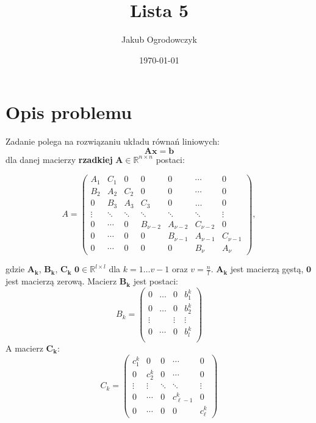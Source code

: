 \documentclass{article}
\begin{document}
\title{Lista 5}
\author{Jakub Ogrodowczyk}
\date{\today}

\maketitle

\section{Opis problemu}
Zadanie polega na rozwiązaniu układu równań liniowych:
\[
    \mathbf{Ax = b}    
\]
dla danej macierzy \textbf{rzadkiej} \( \mathbf{A} \in \mathbb{R}^{n \times n}\) postaci: 

\[
A = 
\begin{pmatrix}
A_1 & C_1 & 0 & 0 & 0 & \cdots & 0 \\
B_2 & A_2 & C_2 & 0 & 0 & \cdots & 0 \\
0 & B_3 & A_3 & C_3 & 0 & \hdots & 0  \\
\vdots & \ddots & \ddots & \ddots & \ddots & \ddots & \vdots \\
0 & \cdots & 0 & B_{\nu-2} & A_{\nu-2} & C_{\nu-2} & 0 \\
0 & \cdots & 0 & 0 & B_{\nu-1} & A_{\nu-1} & C_{\nu-1} \\
0 & \cdots & 0 & 0 & 0 & B_\nu & A_\nu
\end{pmatrix},
\]

gdzie $\mathbf{A_k}$, $\mathbf{B_k}$, $\mathbf{C_k}$ $\mathbf{0} \in \mathbb{R}^{l \times l}$ dla $k=1\hdots v-1$ oraz $v=\frac{n}{l}$.
$\mathbf{A_k}$ jest macierzą gęstą, $\mathbf{0}$ jest macierzą zerową.
Macierz $\mathbf{B_k}$ jest postaci:
\[
B_k = 
\begin{pmatrix}
0 & \hdots & 0  & b_1^k \\
0 & \hdots & 0  & b_2^k \\
\vdots &  & \vdots  & \vdots \\
0 & \cdots & 0  & b_l^k \\
\end{pmatrix}
\]
A macierz $\mathbf{C_k}$:
\[
C_k = 
\begin{pmatrix}
c_1^k & 0 & 0 & \cdots & 0 \\
0 & c_2^k & 0 & \cdots & 0 \\
\vdots & \vdots & \ddots & \ddots & \vdots \\
0 & \cdots & 0 & c_{\ell-1}^k & 0 \\
0 & \cdots & 0 & 0 & c_{\ell}^k
\end{pmatrix}
\]
\end{document}
